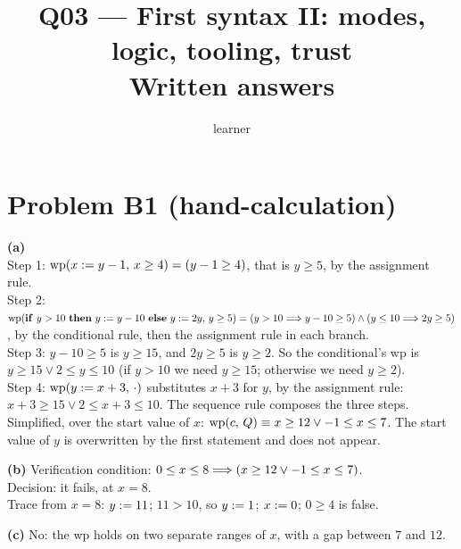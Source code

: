 \documentclass[11pt]{article}
\title{Q03 --- First syntax II: modes, logic, tooling, trust \\ \large Written answers}
\author{learner}
\date{}
\begin{document}
\maketitle

\section*{Problem B1 (hand-calculation)}\label{ans:B1}
\begin{answer}
\textbf{(a)} \\
Step 1: $\mathrm{wp}(x \mathrel{:=} y - 1,\,x \geq 4) = (y - 1 \geq 4)$, that is $y \geq 5$,
\quad by the assignment rule. \\
Step 2: $\WP{\mathbf{if}\ y > 10\ \mathbf{then}\ y \assign y - 10\ \mathbf{else}\ y \assign 2y}{y \geq 5}
= (y > 10 \impl y - 10 \geq 5) \wedge (y \leq 10 \impl 2y \geq 5)$,
\quad by the conditional rule, then the assignment rule in each branch. \\
Step 3: $y - 10 \geq 5$ is $y \geq 15$, and $2y \geq 5$ is $y \geq 2$. So the
conditional's wp is $y \geq 15 \vee 2 \leq y \leq 10$ (if $y > 10$ we need
$y \geq 15$; otherwise we need $y \geq 2$). \\
Step 4: $\mathrm{wp}(y \mathrel{:=} x + 3,\,\cdot)$ substitutes $x + 3$ for $y$, by the
assignment rule: $x + 3 \geq 15 \vee 2 \leq x + 3 \leq 10$. The sequence rule
composes the three steps. \\
Simplified, over the start value of $x$:
$\mathrm{wp}(c,\,Q) \equiv x \geq 12 \vee -1 \leq x \leq 7$. The start value of $y$ is
overwritten by the first statement and does not appear.

\textbf{(b)} Verification condition:
$0 \leq x \leq 8 \Longrightarrow (x \geq 12 \vee -1 \leq x \leq 7)$. \\
Decision: it fails, at $x = 8$. \\
Trace from $x = 8$: $y \mathrel{:=} 11$; $11 > 10$, so $y \mathrel{:=} 1$; $x \mathrel{:=} 0$;
$0 \geq 4$ is false.

\textbf{(c)} No: the wp holds on two separate ranges of $x$, with a gap
between $7$ and $12$.
\end{answer}

\end{document}
